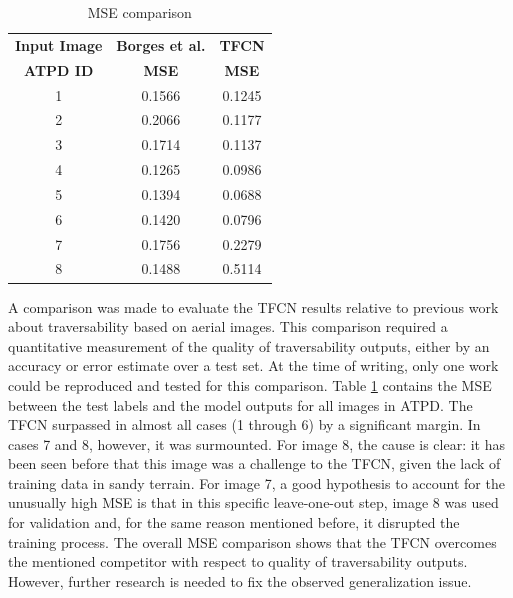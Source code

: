 \documentclass[conference]{IEEEtran}
\begin{document}
\begin{table}[htbp]
\begin{center}
\caption{MSE comparison}
\begin{tabular}{|c|c c|}
\hline
\textbf{Input Image} & \textbf{Borges et al.\cite{borges:2019}} & \textbf{TFCN} \\
\textbf{ATPD ID} & \textbf{MSE} & \textbf{MSE} \\
\hline
1 & 0.1566 & \cellcolor{blue!15} 0.1245 \\ %
2 & 0.2066 & \cellcolor{blue!15} 0.1177 \\ %
3 & 0.1714 & \cellcolor{blue!15} 0.1137 \\ %
4 & 0.1265 & \cellcolor{blue!15} 0.0986 \\ %
5 & 0.1394 & \cellcolor{blue!15} 0.0688 \\ %
6 & 0.1420 & \cellcolor{blue!15} 0.0796 \\ %
7 & \cellcolor{blue!15} 0.1756 & 0.2279 \\ %
8 & \cellcolor{blue!15} 0.1488 & 0.5114 \\ \hline
\end{tabular}
\label{tab:comparison-mse}
\end{center}
\end{table}

A comparison was made to evaluate the TFCN results relative to previous work about traversability based on aerial images.
This comparison required a quantitative measurement of the quality of traversability outputs, either by an accuracy or error estimate over a test set.
At the time of writing, only one work \cite{borges:2019} could be reproduced and tested for this comparison.
Table \ref{tab:comparison-mse} contains the MSE between the test labels and the model outputs for all images in ATPD.
The TFCN surpassed \cite{borges:2019} in almost all cases (1 through 6) by a significant margin.
In cases 7 and 8, however, it was surmounted.
For image 8, the cause is clear: it has been seen before that this image was a challenge to the TFCN, given the lack of training data in sandy terrain.
For image 7, a good hypothesis to account for the unusually high MSE is that in this specific leave-one-out step, image 8 was used for validation and, for the same reason mentioned before, it disrupted the training process.
The overall MSE comparison shows that the TFCN overcomes the mentioned competitor with respect to quality of traversability outputs.
However, further research is needed to fix the observed generalization issue.
\end{document}
